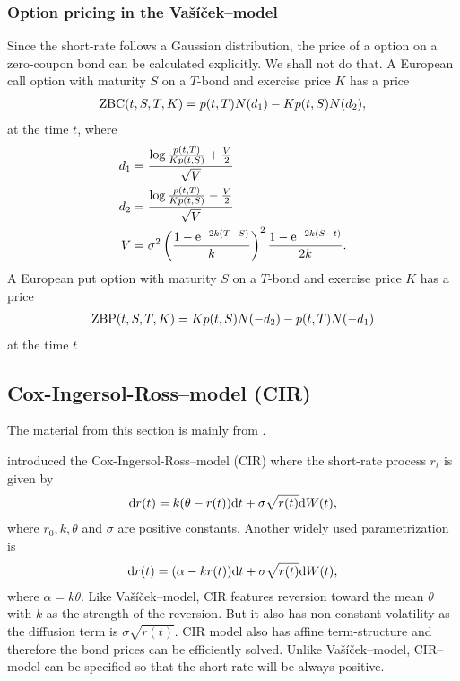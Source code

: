 \subsubsection{Option pricing in the Va\v{s}\'{i}\v{c}ek--model}

Since the short-rate follows a Gaussian distribution, the price of a option on a zero-coupon bond can be calculated explicitly. We shall not do that. A European call option with maturity $S$ on a $T$-bond and exercise price $K$ has a price
	\begin{align}
		\operatorname{\mathrm{ZBC}}(t, S, T, K) = p(t,T) N(d_1) - K p(t,S) N(d_2),
	\end{align}
at the time $t$, where
	\begin{align}
		d_1 &= \frac{ \log \frac{p(t,T)}{K p(t,S)} + \frac{V}{2} }{ \sqrt{V} } \\
		d_2 &= \frac{ \log \frac{p(t,T)}{K p(t,S)} - \frac{V}{2} }{ \sqrt{V} } \\
		V &= \sigma^2 \left( \frac{1 - \mathrm{e}^{-2k(T-S)}}{k} \right)^2 \frac{1 - \mathrm{e}^{-2k(S-t)}}{2k} .
	\end{align}
A European put option with maturity $S$ on a $T$-bond and exercise price $K$ has a price
\begin{align}
\operatorname{\mathrm{ZBP}}(t, S, T, K) = K p(t,S) N( - d_2) - p(t,T) N(-d_1)
\end{align}
at the time $t$

\subsection{Cox-Ingersol-Ross--model (CIR)}
\label{sec:cir}

The material from this section is mainly from \textcite[pp. 64--68]{brigo2007interest}.

\textcite{coxingersollross1985theory} introduced the Cox-Ingersol-Ross--model (CIR) where the short-rate process $r_t$ is given by
\begin{align}
\mathrm{d} r(t) = k( \theta - r(t) ) \mathrm{d} t + \sigma \sqrt{r(t)} \mathrm{d} W(t) ,
\end{align}
where $r_0, k, \theta$ and $\sigma$ are positive constants. Another widely used parametrization is
\begin{align}
\mathrm{d} r(t) = ( \alpha - k r(t) ) \mathrm{d} t + \sigma \sqrt{r(t)} \mathrm{d} W(t) ,
\end{align}
where $\alpha = k \theta$. Like Va\v{s}\'{i}\v{c}ek--model, CIR features reversion toward the mean $\theta$ with $k$ as the strength of the reversion. But it also has non-constant volatility as the diffusion term is $\sigma \sqrt{r(t)}$. CIR model also has affine term-structure and therefore the bond prices can be efficiently solved. Unlike Va\v{s}\'{i}\v{c}ek--model, CIR--model can be specified so that the short-rate will be always positive.

